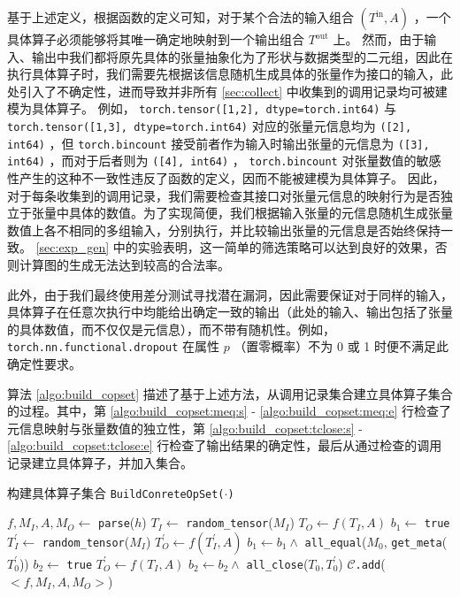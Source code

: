基于上述定义，根据函数的定义可知，对于某个合法的输入组合 $(T^\text{in}, A)$ ，一个具体算子必须能够将其唯一确定地映射到一个输出组合 $T^\text{out}$ 上。
然而，由于输入、输出中我们都将原先具体的张量抽象化为了形状与数据类型的二元组，因此在执行具体算子时，我们需要先根据该信息随机生成具体的张量作为接口的输入，此处引入了不确定性，进而导致并非所有 \ref{sec:collect} 中收集到的调用记录均可被建模为具体算子。
例如， \texttt{torch.tensor([1,2], dtype=torch.int64)} 与 \texttt{torch.tensor([1,3], dtype=torch.int64)} 对应的张量元信息均为 \texttt{([2], int64)} ，但 \texttt{torch.bincount} 接受前者作为输入时输出张量的元信息为 \texttt{([3], int64)} ，而对于后者则为 \texttt{([4], int64)} ， \texttt{torch.bincount} 对张量数值的敏感性产生的这种不一致性违反了函数的定义，因而不能被建模为具体算子。
因此，对于每条收集到的调用记录，我们需要检查其接口对张量元信息的映射行为是否独立于张量中具体的数值。为了实现简便，我们根据输入张量的元信息随机生成张量数值上各不相同的多组输入，分别执行，并比较输出张量的元信息是否始终保持一致。 \ref{sec:exp_gen} 中的实验表明，这一简单的筛选策略可以达到良好的效果，否则计算图的生成无法达到较高的合法率。

此外，由于我们最终使用差分测试寻找潜在漏洞，因此需要保证对于同样的输入，具体算子在任意次执行中均能给出确定一致的输出（此处的输入、输出包括了张量的具体数值，而不仅仅是元信息），而不带有随机性。例如， \texttt{torch.nn.functional.dropout} 在属性 $p$ （置零概率）不为 0 或 1 时便不满足此确定性要求。

算法 \ref{algo:build_copset} 描述了基于上述方法，从调用记录集合建立具体算子集合的过程。其中，第 \ref{algo:build_copset:meq:s} - \ref{algo:build_copset:meq:e} 行检查了元信息映射与张量数值的独立性，第 \ref{algo:build_copset:tclose:s} - \ref{algo:build_copset:tclose:e} 行检查了输出结果的确定性，最后从通过检查的调用记录建立具体算子，并加入集合。

\begin{algorithm}
    \caption{构建具体算子集合 \texttt{BuildConreteOpSet($\cdot$)}}
    \label{algo:build_copset}

 {
    $f, M_I, A, M_O \gets$ \texttt{parse}($h$) 
    $T_I \gets$ \texttt{random\_tensor}($M_I$) 
    $T_O \gets f(T_I, A)$ 
     {
        $b_1 \gets$ \texttt{true} \label{algo:build_copset:meq:s}\;
         {
            $T_I^{'} \gets$ \texttt{random\_tensor}($M_I$)\;
            $T_O^{'} \gets f(T_I^{'}, A)$\;
            $b_1 \gets b_1 \wedge$ \texttt{all\_equal}($M_0$, \texttt{get\_meta}($T_0^{'}$))\;
        }
         {\Continue} \label{algo:build_copset:meq:e}
        $b_2 \gets$ \texttt{true} \label{algo:build_copset:tclose:s} \;
         {
            $T_O^{'} \gets f(T_I, A)$\;
            $b_2 \gets b_2 \wedge$ \texttt{all\_close}($T_0, T_0^{'}$)\;
        }
         {\Continue} \label{algo:build_copset:tclose:e}
        $\mathcal{C}$\texttt{.add}($<f, M_I, A, M_O>$)\;
    }
}
\end{algorithm}

